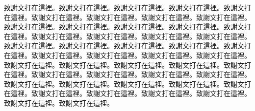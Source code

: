 
\begin{acknowledgement}

致謝文打在這裡。致謝文打在這裡。致謝文打在這裡。致謝文打在這裡。致謝文打在這裡。致謝文打在這裡。致謝文打在這裡。致謝文打在這裡。致謝文打在這裡。致謝文打在這裡。致謝文打在這裡。致謝文打在這裡。致謝文打在這裡。致謝文打在這裡。致謝文打在這裡。致謝文打在這裡。致謝文打在這裡。致謝文打在這裡。致謝文打在這裡。致謝文打在這裡。致謝文打在這裡。致謝文打在這裡。致謝文打在這裡。致謝文打在這裡。致謝文打在這裡。致謝文打在這裡。致謝文打在這裡。致謝文打在這裡。致謝文打在這裡。致謝文打在這裡。致謝文打在這裡。致謝文打在這裡。致謝文打在這裡。致謝文打在這裡。致謝文打在這裡。致謝文打在這裡。致謝文打在這裡。致謝文打在這裡。致謝文打在這裡。致謝文打在這裡。致謝文打在這裡。致謝文打在這裡。致謝文打在這裡。致謝文打在這裡。致謝文打在這裡。致謝文打在這裡。致謝文打在這裡。

\end{acknowledgement}